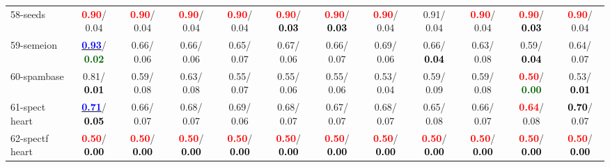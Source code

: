 \begin{table}[h]
\begin{center}
{\begin{tabular}{lc|c|c|c|c|c|c|c|c|c|c}
58-seeds & \textcolor{red}{\textbf{  0.90}}/  0.04 & \textcolor{red}{\textbf{  0.90}}/  0.04 & \textcolor{red}{\textbf{  0.90}}/  0.04 & \textcolor{red}{\textbf{  0.90}}/  0.04 & \textcolor{red}{\textbf{  0.90}}/\textcolor{black}{\textbf{  0.03}} & \textcolor{red}{\textbf{  0.90}}/\textcolor{black}{\textbf{  0.03}} & \textcolor{red}{\textbf{  0.90}}/  0.04 &   0.91/  0.04 & \textcolor{red}{\textbf{  0.90}}/  0.04 & \textcolor{red}{\textbf{  0.90}}/\textcolor{black}{\textbf{  0.03}} & \textcolor{red}{\textbf{  0.90}}/  0.04 \\
59-semeion & \underline{\textcolor{blue}{\textbf{  0.93}}}/\textcolor{darkgreen}{\textbf{  0.02}} &   0.66/  0.06 &   0.66/  0.06 &   0.65/  0.07 &   0.67/  0.06 &   0.66/  0.07 &   0.69/  0.06 &   0.66/\textcolor{black}{\textbf{  0.04}} &   0.63/  0.08 &   0.59/\textcolor{black}{\textbf{  0.04}} &   0.64/  0.07 \\
60-spambase &   0.81/\textcolor{black}{\textbf{  0.01}} &   0.59/  0.08 &   0.63/  0.08 &   0.55/  0.07 &   0.55/  0.06 &   0.55/  0.06 &   0.53/  0.04 &   0.59/  0.09 &   0.59/  0.08 & \textcolor{red}{\textbf{  0.50}}/\textcolor{darkgreen}{\textbf{  0.00}} &   0.53/\textcolor{black}{\textbf{  0.01}} \\ \hline
61-spect heart & \underline{\textcolor{blue}{\textbf{  0.71}}}/\textcolor{black}{\textbf{  0.05}} &   0.66/  0.07 &   0.68/  0.07 &   0.69/  0.06 &   0.68/  0.07 &   0.67/  0.07 &   0.68/  0.07 &   0.65/  0.08 &   0.66/  0.07 & \textcolor{red}{\textbf{  0.64}}/  0.08 & \textcolor{black}{\textbf{  0.70}}/  0.07 \\
62-spectf heart & \textcolor{red}{\textbf{  0.50}}/\textcolor{black}{\textbf{  0.00}} & \textcolor{red}{\textbf{  0.50}}/\textcolor{black}{\textbf{  0.00}} & \textcolor{red}{\textbf{  0.50}}/\textcolor{black}{\textbf{  0.00}} & \textcolor{red}{\textbf{  0.50}}/\textcolor{black}{\textbf{  0.00}} & \textcolor{red}{\textbf{  0.50}}/\textcolor{black}{\textbf{  0.00}} & \textcolor{red}{\textbf{  0.50}}/\textcolor{black}{\textbf{  0.00}} & \textcolor{red}{\textbf{  0.50}}/\textcolor{black}{\textbf{  0.00}} & \textcolor{red}{\textbf{  0.50}}/\textcolor{black}{\textbf{  0.00}} & \textcolor{red}{\textbf{  0.50}}/\textcolor{black}{\textbf{  0.00}} & \textcolor{red}{\textbf{  0.50}}/\textcolor{black}{\textbf{  0.00}} & \textcolor{red}{\textbf{  0.50}}/\textcolor{black}{\textbf{  0.00}} \\

\end{tabular}}
\end{center}
\end{table}
